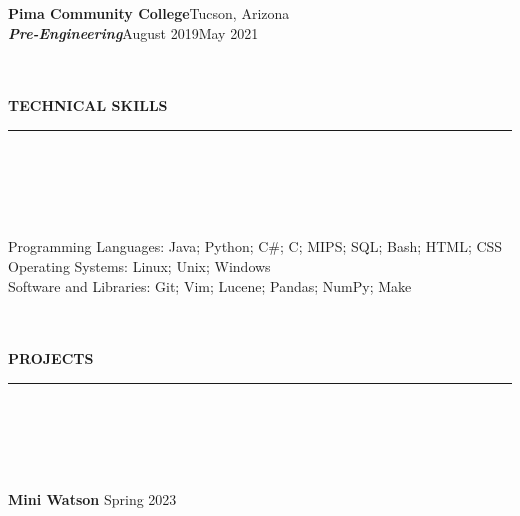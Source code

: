 \documentclass[10pt]{book}
\begin{document}
{        {
            \fontsize{11}{11}
            \selectfont
            \noindent\textbf{Pima Community College}\hfill Tucson, Arizona
            \\
            \textbf{\textit{Pre-Engineering}}\hfill August 2019\hspace{3pt}\textendash\hspace{3pt}May 2021
            \\
        }
        \vspace{-\baselineskip}\vspace{-\parskip}
        \begin{spacing}{0.2}
            {
                \noindent\fontsize{12}{12}
                \\
                \\
                \selectfont\textbf{TECHNICAL SKILLS}
                \\
            }
            \rule{\linewidth}{0.4pt}
            \\
            \\
            \\
            \\
        \end{spacing}
        \noindent
        Programming Languages: Java; Python; C\#; C; MIPS; SQL; Bash; HTML; CSS
        \\
        Operating Systems: Linux; Unix; Windows
        \\
        Software and Libraries: Git; Vim; Lucene; Pandas; NumPy; Make
        \begin{spacing}{0.2}
            {
                \noindent\fontsize{12}{12}
                \\
                \\
                \selectfont\textbf{PROJECTS}
                \\
            }
            \rule{\linewidth}{0.4pt}
            \\
            \\
            \\
            \\
        \end{spacing}
        {
            \noindent\fontsize{11}{11}
            \selectfont\hspace{-3pt}\textbf{Mini Watson \textendash}\hfill Spring 2023
        }
}
\end{document}
